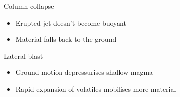 \documentclass{beamer}
\begin{document}
\begin{frame}
\begin{columns}[t]
\begin{column}{0.5\paperwidth}
      Column collapse

      \begin{itemize}
      \item Erupted jet doesn't become buoyant \\
      \item Material falls back to the ground  \\
      \end{itemize}

      Lateral blast

      \begin{itemize}
      \item Ground motion depressurises shallow magma \\
      \item Rapid expansion of volatiles mobilises more material  \\
      \end{itemize}
    \end{column}

  \end{columns}
  
\end{frame}
\end{document}
